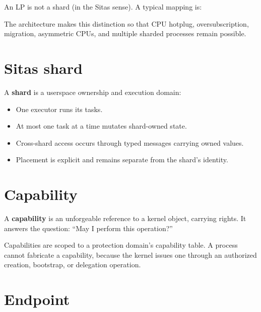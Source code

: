 An LP is not a shard (in the Sitas sense). A typical mapping is:

\begin{center}
\end{center}

The architecture makes this distinction so that CPU hotplug, oversubscription,
migration, asymmetric CPUs, and multiple sharded processes remain possible.

\section{Sitas shard}

A \textbf{shard} is a userspace ownership and execution domain:

\begin{itemize}
    \item One executor runs its tasks.
    \item At most one task at a time mutates shard-owned state.
    \item Cross-shard access occurs through typed messages carrying owned values.
    \item Placement is explicit and remains separate from the shard's identity.
\end{itemize}

\section{Capability}

A \textbf{capability} is an unforgeable reference to a kernel object, carrying
rights. It answers the question: ``May I perform this operation?''

Capabilities are scoped to a protection domain's capability table. A process
cannot fabricate a capability, because the kernel issues one through an authorized
creation, bootstrap, or delegation operation.

\section{Endpoint}

